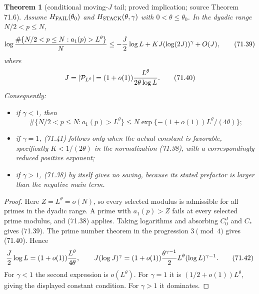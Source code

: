 \documentclass[10pt,reqno]{amsart}
\newtheorem{theorem}{Theorem}[section]
\theoremstyle{definition}
\newcommand{\1}{\mathbf 1}
\begin{document}
\begin{theorem}[conditional moving-$J$ tail; proved implication; source Theorem 71.6]\label{thm:moving-J-tail}  Assume
$H_{\rm FAIL}(\theta_0)$ and $H_{\rm STACK}(\theta,\gamma)$ with
$0<\theta\leq\theta_0$.  In the dyadic range $N/2<p\leq N$,
\begin{equation}
 \log{\#\{N/2<p\leq N:a_1(p)>L^\theta\}\over N}
 \leq-{J\over2}\log L+KJ(\log(2J))^\gamma+O(J),          \tag{71.39}
\end{equation}
where
\begin{equation}
 J=|\mathcal P_{L^\theta}|
   =(1+o(1)){L^\theta\over2\theta\log L}.                \tag{71.40}
\end{equation}
Consequently:

\begin{itemize}[leftmargin=*]
\item if $\gamma<1$, then
  \begin{equation}
   \#\{N/2<p\leq N:a_1(p)>L^\theta\}
   \leq N\exp\{-(1+o(1))L^\theta/(4\theta)\};            \tag{71.41}
  \end{equation}
\item if $\gamma=1$, (71.41) follows only when the actual constant is
  favorable, specifically $K<1/(2\theta)$ in the normalization
  (71.38), with a correspondingly reduced positive exponent;
\item if $\gamma>1$, (71.38) by itself gives no saving, because its stated
  prefactor is larger than the negative main term.
\end{itemize}

\end{theorem}
\begin{proof} Here $Z=L^\theta=o(N)$, so every selected modulus is admissible
for all primes in the dyadic range.  A prime with $a_1(p)>Z$ fails at every
selected prime modulus, and (71.38) applies.  Taking logarithms and absorbing
$C_0^J$ and $C_*$ gives (71.39).  The prime number theorem in the progression $3\pmod4$
gives (71.40).  Hence
\begin{equation}
 {J\over2}\log L=(1+o(1)){L^\theta\over4\theta},\qquad
 J(\log J)^\gamma
 =(1+o(1)){\theta^{\gamma-1}\over2}
       L^\theta(\log L)^{\gamma-1}.                      \tag{71.42}
\end{equation}
For $\gamma<1$ the second expression is $o(L^\theta)$.  For
$\gamma=1$ it is $(1/2+o(1))L^\theta$, giving the displayed
constant condition.  For $\gamma>1$ it dominates.
\end{proof}
\end{document}

